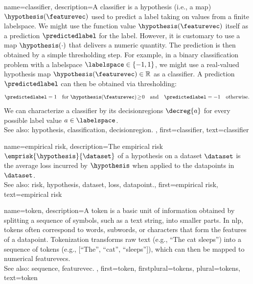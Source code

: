{name={classifier},
	description={A classifier is a \gls{hypothesis} (i.e., a \gls{map}) $\hypothesis(\featurevec)$ 
		used to predict a \gls{label} taking on values from a finite \gls{labelspace}. We might use the 
		\gls{function} value $\hypothesis(\featurevec)$ itself as a \gls{prediction} $\predictedlabel$ for 
		the \gls{label}. However, it is customary to use a \gls{map} $\hypothesis(\cdot)$ that delivers 
		a numeric quantity. The \gls{prediction} is then obtained by a simple thresholding step. 
		For example, in a binary \gls{classification} problem with a \gls{labelspace} $\labelspace \in  \{ -1,1\}$, 
		we might use a real-valued \gls{hypothesis} \gls{map} $\hypothesis(\featurevec) \in \mathbb{R}$ 
		as a classifier. A \gls{prediction} $\predictedlabel$ can then be obtained via thresholding:
		 \begin{equation} 
		 	\label{equ_def_threshold_bin_classifier_dict}
		 	\predictedlabel =1 \quad  \mbox{for } \hypothesis(\featurevec)\!\geq\!0 \quad \mbox{and} \quad	\predictedlabel =-1  \quad \mbox{otherwise.}
	 	\end{equation}
 		We can characterize a classifier by its \glspl{decisionregion} $\decreg{a}$ for 
 		every possible \gls{label} value $a \in \labelspace$.
					\\ 
		See also: \gls{hypothesis}, \gls{classification}, \gls{decisionregion}. },
	first={classifier},
	text={classifier} 
}

{name={empirical risk},
	description={The empirical \gls{risk} $\emprisk{\hypothesis}{\dataset}$ 
  		of a \gls{hypothesis} on a \gls{dataset} $\dataset$ is the average \gls{loss} incurred 
  		by $\hypothesis$ when applied to the \glspl{datapoint} in $\dataset$.
				\\ 
		See also: \gls{risk}, \gls{hypothesis}, \gls{dataset}, \gls{loss}, \gls{datapoint}.},
  	first={empirical risk},
  	text={empirical risk} 
}

{name={token},
	description={A token is a basic unit of information 
  		obtained by splitting a \gls{sequence} of symbols, such as a text string, 
  		into smaller parts. In \gls{nlp}, tokens often correspond to words, subwords, 
  		or characters that form the \glspl{feature} of a \gls{datapoint}. 
  		Tokenization transforms raw text (e.g., ``The cat sleeps'') into a 
  		\gls{sequence} of tokens (e.g., [``The'', ``cat'', ``sleeps'']), which can
  		then be mapped to numerical \glspl{featurevec}.
		\\
		See also: \gls{sequence}, \gls{featurevec}. }, 
  	first={token}, 
  	firstplural={tokens}, 
  	plural={tokens}, 
  	text={token}
}


